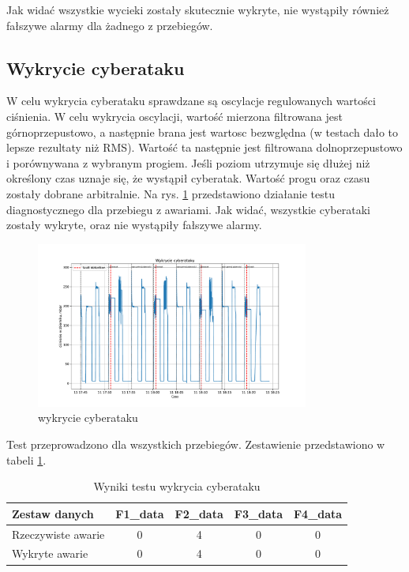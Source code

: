 \documentclass[a4paper,12pt]{article}
\begin{document}
Jak widać wszystkie wycieki zostały skutecznie wykryte, nie wystąpiły również fałszywe alarmy dla żadnego z przebiegów.

\subsection{Wykrycie cyberataku}

W celu wykrycia cyberataku sprawdzane są oscylacje regulowanych wartości ciśnienia. W celu wykrycia oscylacji, wartość mierzona filtrowana jest górnoprzepustowo, a następnie brana jest wartosc bezwględna (w testach dało to lepsze rezultaty niż RMS). Wartość ta następnie jest filtrowana dolnoprzepustowo i porównywana z wybranym progiem. Jeśli poziom utrzymuje się dłużej niż określony czas uznaje się, że wystąpił cyberatak. Wartość progu oraz czasu zostały dobrane arbitralnie. Na rys. \ref{fig:atak1} przedstawiono działanie testu diagnostycznego dla przebiegu z awariami. Jak widać, wszystkie cyberataki zostały wykryte, oraz nie wystąpiły fałszywe alarmy.

\begin{figure}[H]
        \centering
        \includegraphics[width=0.8\textwidth]{attack_detection}
        \caption{wykrycie cyberataku}
        \label{fig:atak1}
\end{figure}

Test przeprowadzono dla wszystkich przebiegów. Zestawienie przedstawiono w tabeli \ref{tab:atak2}.

\begin{table}[H]
\centering
\caption{Wyniki testu wykrycia cyberataku}
\begin{tabular}{lcccc}
\toprule
Zestaw danych & F1\_data & F2\_data & F3\_data & F4\_data\\
\midrule
Rzeczywiste awarie & 0 & 4 & 0 & 0\\
Wykryte awarie & 0 & 4 & 0 & 0\\
\bottomrule
\end{tabular}
\label{tab:atak2}
\end{table}
\end{document}
